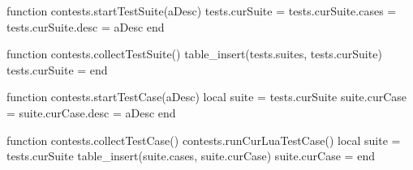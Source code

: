 
\startchapter[title=Unit Test Suites]

\startMkIVCode

\def\startTestSuite[#1]{%
  \startsubsection[title=Test Suite: #1]
  \directlua{thirddata.contests.startTestSuite('#1')}
}

\def\stopTestSuite{%
  \stopsubsection%
  \directlua{thirddata.contests.collectTestSuite()}
}

\def\startTestCase[#1]{%
  \startsubsubsection[title=Test Case: #1]
  \directlua{thirddata.contests.startTestCase('#1')}
}

\def\stopTestCase{%
  \stopsubsubsection%
  \directlua{thirddata.contests.collectTestCase()}
}

\stopMkIVCode

\startLuaCode

function contests.startTestSuite(aDesc)
  tests.curSuite       = {}
  tests.curSuite.cases = {}
  tests.curSuite.desc  = aDesc
end

function contests.collectTestSuite()
  table_insert(tests.suites, tests.curSuite)
  tests.curSuite = {}
end

function contests.startTestCase(aDesc)
  local suite = tests.curSuite
  suite.curCase = {}
  suite.curCase.desc = aDesc
end

function contests.collectTestCase()
  contests.runCurLuaTestCase()
  local suite = tests.curSuite
  table_insert(suite.cases, suite.curCase)
  suite.curCase = {}
end

\stopLuaCode

\stopchapter